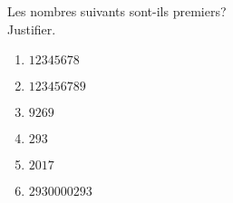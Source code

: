 
Les nombres suivants sont-ils premiers?\\
Justifier.
\begin{enumerate}
\item $12345678$
\item $123456789$
\item $9269$
\item $293$
\item $2017$
\item $2930000293$

\end{enumerate}




